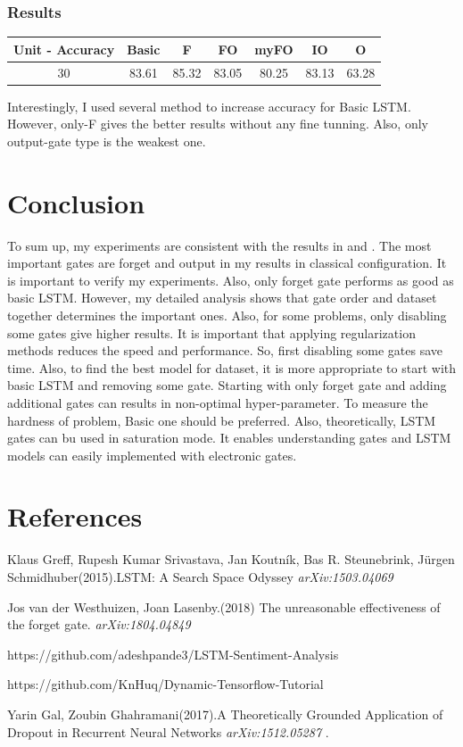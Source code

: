 \documentclass[12pt, letterpaper]{article}
\begin{document}
\subsubsection{Results}
\begin{center}
\begin{tabular}{ |c|c|c|c|c|c|c|  } 
 \hline
Unit - Accuracy   & Basic  &  F     &  FO     & myFO  & IO    &    O  \\ \hline 
30        & 83.61   &  85.32  &  83.05  & 80.25  & 83.13  & 63.28 \\ \hline
 \hline
\end{tabular}
\end{center}
	Interestingly, I used several method to increase accuracy for Basic LSTM. However, only-F gives the better results without any fine tunning. Also, only output-gate type is the weakest one.
\section{Conclusion}
	To sum up, my experiments are consistent with the results in \cite{1} and \cite{2}. The most important gates are forget and output in my results in classical configuration. It is important to verify my experiments. Also, only forget gate performs as good as basic LSTM. However, my detailed analysis shows that gate order and dataset together determines the important ones. Also, for some problems, only disabling some gates give higher results. It is important that applying regularization methods reduces the speed and
performance. So, first disabling some gates save time. Also, to find the best model for dataset, it is more appropriate to start with basic LSTM and removing some gate. Starting with only forget gate and adding additional gates can results in non-optimal hyper-parameter. To measure the hardness of problem, Basic one should be preferred. Also, theoretically, LSTM gates can bu used in saturation mode. It enables understanding gates and LSTM models can easily implemented with electronic gates.  
\section{References}


\begin{thebibliography}{9}
Klaus Greff, Rupesh Kumar Srivastava, Jan Koutník, Bas R. Steunebrink, Jürgen Schmidhuber(2015).LSTM: A Search Space Odyssey
\textit{ arXiv:1503.04069 }


Jos van der Westhuizen, Joan Lasenby.(2018)  The unreasonable effectiveness of the forget gate. \textit{ 	arXiv:1804.04849}

 
https://github.com/adeshpande3/LSTM-Sentiment-Analysis

https://github.com/KnHuq/Dynamic-Tensorflow-Tutorial

Yarin Gal, Zoubin Ghahramani(2017).A Theoretically Grounded Application of Dropout in Recurrent Neural Networks 
\textit{arXiv:1512.05287 }. 
\end{thebibliography}
\end{document}
